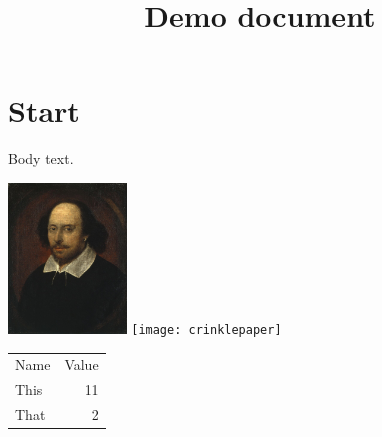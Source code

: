 \documentclass{article}
\begin{document}
\title{Demo document}
\maketitle


\section{Start}
Body text.



\includegraphics[height=4cm,alt={Portrait of William Shakespear}]{shake.jpg}
\texttt{[image: crinklepaper]}



\begin{tabular}{lr}
    Name & Value \\
    This & 11 \\
    That & 2
\end{tabular}



\end{document}
